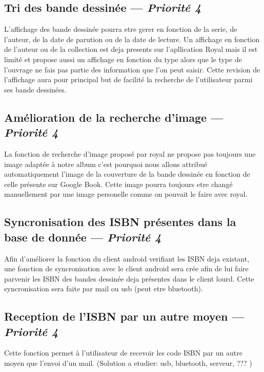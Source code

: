 \subsection[Tri des bande dessinée]{Tri des bande dessinée — \emph{Priorité 4}}
L'affichage des bande dessinée pourra etre gerer en fonction de la serie, de l'auteur, de la date de parution ou de la date de lecture. Un affichage en fonction de l'auteur ou de la collection est deja presents sur l'apllication Royal mais il est limité et propose aussi un affichage en fonction du type alors que le type de l'ouvrage ne fais pas partie des information que l'on peut saisir. Cette revision de l'affichage aura pour principal but de facilité la recherche de l'utilisateur parmi ses bande dessinées.

\subsection[Amélioration de la recherche d'image]{Amélioration de la recherche d'image — \emph{Priorité 4}}
La fonction de recherche d'image proposé par royal ne propose pas toujours une image adaptée à notre album c'est pourquoi nous allons attribué automatiquement l'image de la couverture de la bande dessinée en fonction de celle présente sur Google Book. Cette image pourra toujours etre changé manuellement par une image personelle comme on pouvait le faire avec royal.

\subsection[Syncronisation des ISBN présentes dans la base de donnée]{Syncronisation des ISBN présentes dans la base de donnée — \emph{Priorité 4}}
Afin d'améliorer la fonction du client android verifiant les ISBN deja existant, une fonction de syncronisation avec le client android sera crée afin de lui faire parvenir les ISBN des bandes dessinée deja présentes dans le client lourd. Cette syncronisation sera faite par mail ou usb (peut etre bluetooth).

\subsection[Reception de l'ISBN par un autre moyen]{Reception de l'ISBN par un autre moyen — \emph{Priorité 4}}
Cette fonction permet à l'utilisateur de recevoir les code ISBN par un autre moyen que l'envoi d'un mail. (Solution a etudier: usb, bluetooth, serveur, ??? )

